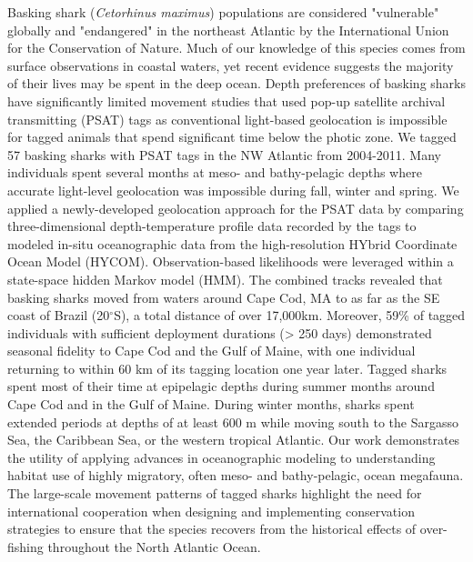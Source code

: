 Basking shark (\textit{Cetorhinus maximus}) populations are considered "vulnerable" globally and "endangered" in the northeast Atlantic by the International Union for the Conservation of Nature. Much of our knowledge of this species comes from surface observations in coastal waters, yet recent evidence suggests the majority of their lives may be spent in the deep ocean. Depth preferences of basking sharks have significantly limited movement studies that used pop-up satellite archival transmitting (PSAT) tags as conventional light-based geolocation is impossible for tagged animals that spend significant time below the photic zone. We tagged 57 basking sharks with PSAT tags in the NW Atlantic from 2004-2011. Many individuals spent several months at meso- and bathy-pelagic depths where accurate light-level geolocation was impossible during fall, winter and spring. We applied a newly-developed geolocation approach for the PSAT data by comparing three-dimensional depth-temperature profile data recorded by the tags to modeled in-situ oceanographic data from the high-resolution HYbrid Coordinate Ocean Model (HYCOM). Observation-based likelihoods were leveraged within a state-space hidden Markov model (HMM). The combined tracks revealed that basking sharks moved from waters around Cape Cod, MA to as far as the SE coast of Brazil (20$^{\circ}$S), a total distance of over 17,000km. Moreover, 59\% of tagged individuals with sufficient deployment durations (> 250 days) demonstrated seasonal fidelity to Cape Cod and the Gulf of Maine, with one individual returning to within 60 km of its tagging location one year later. Tagged sharks spent most of their time at epipelagic depths during summer months around Cape Cod and in the Gulf of Maine. During winter months, sharks spent extended periods at depths of at least 600 m while moving south to the Sargasso Sea, the Caribbean Sea, or the western tropical Atlantic. Our work demonstrates the utility of applying advances in oceanographic modeling to understanding habitat use of highly migratory, often meso- and bathy-pelagic, ocean megafauna. The large-scale movement patterns of tagged sharks highlight the need for international cooperation when designing and implementing conservation strategies to ensure that the species recovers from the historical effects of over-fishing throughout the North Atlantic Ocean.


